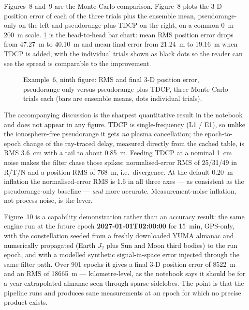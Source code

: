 Figures~8 and~9 are the Monte-Carlo comparison. Figure~8 plots the 3-D position
error of each of the three trials plus the ensemble mean, pseudorange-only on
the left and pseudorange-plus-TDCP on the right, on a common
\SIrange{0}{200}{\meter} scale. \cref{fig:tut-ex6-mc} is the head-to-head bar
chart: mean RMS position error drops from \SI{47.27}{\meter} to
\SI{40.10}{\meter} and mean final error from \SI{21.24}{\meter} to
\SI{19.16}{\meter} when TDCP is added, with the individual trials shown as black
dots so the reader can see the spread is comparable to the improvement.

\begin{figure}[htbp]
  \centering
  \caption{Example~6, ninth figure: RMS and final 3-D position error,
           pseudorange-only versus pseudorange-plus-TDCP, three Monte-Carlo
           trials each (bars are ensemble means, dots individual trials).}
  \label{fig:tut-ex6-mc}
\end{figure}

The accompanying discussion is the sharpest quantitative result in the notebook
and does not appear in any figure. TDCP is single-frequency (L1 / E1), so unlike
the ionosphere-free pseudorange it gets \emph{no} plasma cancellation; the
epoch-to-epoch change of the ray-traced delay, measured directly from the cached
table, is RMS \SI{3.6}{\centi\meter} with a tail to about \SI{0.85}{\meter}.
Feeding TDCP at a nominal \SI{1}{\centi\meter} noise makes the filter chase those
spikes: normalised-error RMS of 25/31/49 in R/T/N and a position RMS of
\SI{768}{\meter}, i.e.\ divergence. At the default \SI{0.20}{\meter} inflation
the normalised-error RMS is 1.6 in all three axes --- as consistent as the
pseudorange-only baseline --- \emph{and} more accurate. Measurement-noise
inflation, not process noise, is the lever.

Figure~10 is a capability demonstration rather than an accuracy result: the same
engine run at the future epoch \textbf{2027-01-01T02:00:00} for
\SI{15}{\minute}, GPS-only, with the constellation seeded from a freshly
downloaded YUMA almanac and numerically propagated (Earth $J_2$ plus Sun and
Moon third bodies) to the run epoch, and with a modelled synthetic
signal-in-space error injected through the same filter path. Over 901 epochs it
gives a final 3-D position error of \SI{8522}{\meter} and an RMS of
\SI{18665}{\meter} --- kilometre-level, as the notebook says it should be for a
year-extrapolated almanac seen through sparse sidelobes. The point is that the
pipeline runs and produces sane measurements at an epoch for which no precise
product exists.


